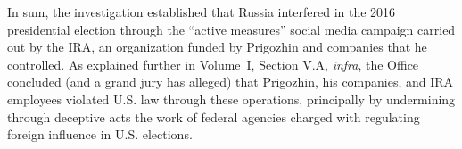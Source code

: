 \hr

In sum, the investigation established that Russia interfered in the 2016 presidential election through the ``active measures'' social media campaign carried out by the IRA, an organization funded by Prigozhin and companies that he controlled.
As explained further in Volume~I, Section V.A, \textit{infra}, the Office concluded (and a grand jury has alleged) that Prigozhin, his companies, and IRA employees violated U.S. law through these operations, principally by undermining through deceptive acts the work of federal agencies charged with regulating foreign influence in U.S. elections.
